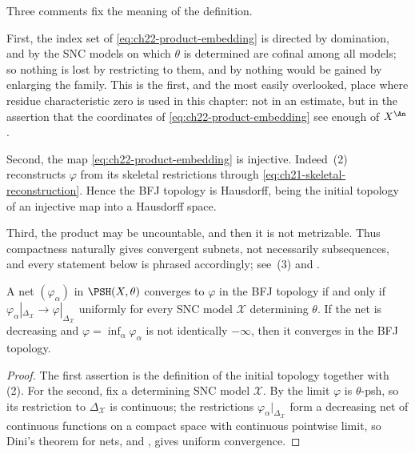Three comments fix the meaning of the definition.

First, the index set of \eqref{eq:ch22-product-embedding} is directed by
domination, and by  the SNC models on which
$\theta$ is determined are cofinal among all models; so nothing is lost by
restricting to them, and by  nothing
would be gained by enlarging the family.  This is the first, and the most
easily overlooked, place where residue characteristic zero is used in this
chapter: not in an estimate, but in the assertion that the coordinates of
\eqref{eq:ch22-product-embedding} see enough of $X^{\An}$.

Second, the map \eqref{eq:ch22-product-embedding} is injective.  Indeed
\,(2) reconstructs $\varphi$ from
its skeletal restrictions through
\eqref{eq:ch21-skeletal-reconstruction}.  Hence the BFJ topology is
Hausdorff, being the initial topology of an injective map into a Hausdorff
space.

Third, the product may be uncountable, and then it is not metrizable.  Thus
compactness naturally gives convergent subnets, not necessarily
subsequences, and every statement below is phrased accordingly; see
\,(3) and .

\begin{lemma}
\label{lem:ch22-convergence-criterion}
A net $(\varphi_\alpha)$ in $\PSH(X,\theta)$ converges to $\varphi$ in
the BFJ topology if and only if
$\varphi_\alpha|_{\Delta_{\mathcal X}}\to\varphi|_{\Delta_{\mathcal X}}$
uniformly for every SNC model $\mathcal X$ determining $\theta$.  If the
net is decreasing and $\varphi=\inf_\alpha\varphi_\alpha$ is not
identically $-\infty$, then it converges in the BFJ topology.
\end{lemma}

\begin{proof}
The first assertion is the definition of the initial topology together with
\,(2).  For the second, fix a determining SNC model
$\mathcal X$.  By  the limit
$\varphi$ is $\theta$-psh, so its restriction to
$\Delta_{\mathcal X}$ is continuous; the restrictions
$\varphi_\alpha|_{\Delta_{\mathcal X}}$ form a decreasing net of
continuous functions on a compact space with continuous pointwise limit, so
Dini's theorem for nets,  and
, gives uniform convergence.
\end{proof}

